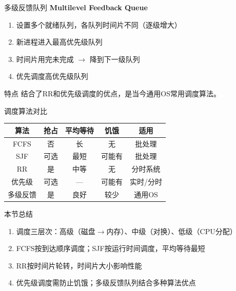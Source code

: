 \documentclass[10pt, aspectratio=169]{beamer}
\begin{document}
\begin{frame}{多级反馈队列}
    \textbf{Multilevel Feedback Queue}

    \begin{enumerate}
        \item 设置多个就绪队列，各队列时间片不同（逐级增大）
        \item 新进程进入最高优先级队列
        \item 时间片用完未完成 $\to$ 降到下一级队列
        \item 优先调度高优先级队列
    \end{enumerate}
    \vspace{0.5em}
    \begin{block}{特点}
        结合了RR和优先级调度的优点，是当今通用OS常用调度算法。
    \end{block}
\end{frame}

\begin{frame}{调度算法对比}
    \begin{tabular}{|c|c|c|c|c|}
        \hline
        算法 & 抢占 & 平均等待 & 饥饿 & 适用 \\
        \hline
        FCFS & 否 & 长 & 无 & 批处理 \\
        SJF & 可选 & 最短 & 可能有 & 批处理 \\
        RR & 是 & 中等 & 无 & 分时系统 \\
        优先级 & 可选 & — & 可能有 & 实时/分时 \\
        多级反馈 & 是 & 良好 & 较少 & 通用OS \\
        \hline
    \end{tabular}
\end{frame}

\begin{frame}{本节总结}
    \begin{enumerate}
        \item 调度三层次：高级（磁盘$\to$内存）、中级（对换）、低级（CPU分配）
        \item FCFS按到达顺序调度；SJF按运行时间调度，平均等待最短
        \item RR按时间片轮转，时间片大小影响性能
        \item 优先级调度需防止饥饿；多级反馈队列结合多种算法优点
    \end{enumerate}
\end{frame}
\end{document}
